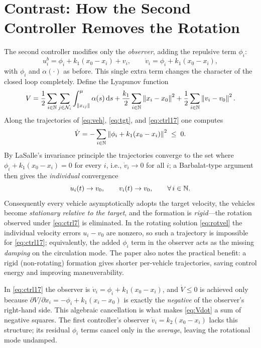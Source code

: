 \section{Contrast: How the Second Controller Removes the Rotation}
\label{sec:second}

The second controller modifies only the \emph{observer}, adding the repulsive term $\phi_i$:
\begin{equation}
  \boxed{\; u_i^b=\phi_i+k_1(x_0-x_i)+v_i, \qquad
  \dot{v}_i=\phi_i+k_1(x_0-x_i), \;}
  \label{eq:ctrl17}
\end{equation}
with $\phi_i$ and $\alpha(\cdot)$ as before. This single extra term changes the character of the
closed loop completely. Define the Lyapunov function
\begin{equation}
  V=\frac12\sum_{i\in\mathbb{N}}\sum_{j\in\mathcal{N}_i}\int_{\left\| x_{ij} \right\|}^{\mu}\alpha(s)\,\mathrm{d} s
    +\frac{k_1}{2}\sum_{i\in\mathbb{N}}\left\| x_i-x_0 \right\|^2
    +\frac12\sum_{i\in\mathbb{N}}\left\| v_i-v_0 \right\|^2 .
  \label{eq:lyap}
\end{equation}
Along the trajectories of \eqref{eq:veh}, \eqref{eq:tgt}, and \eqref{eq:ctrl17} one computes
\begin{equation}
  \dot{V}=-\sum_{i\in\mathbb{N}}\left\| \phi_i+k_1(x_0-x_i) \right\|^2\;\le\;0 .
  \label{eq:Vdot}
\end{equation}
By LaSalle's invariance principle the trajectories converge to the set where
$\phi_i+k_1(x_0-x_i)=0$ for every $i$, i.e., $\dot{v}_i\to0$ for all $i$; a Barbalat-type argument
then gives the \emph{individual} convergence
\begin{equation}
  u_i(t)\to v_0,\qquad v_i(t)\to v_0,\qquad \forall\,i\in\mathbb{N} .
  \label{eq:indiv}
\end{equation}
Consequently every vehicle asymptotically adopts the target velocity, the vehicles become
\emph{stationary relative to the target}, and the formation is \emph{rigid}---the rotation observed
under \eqref{eq:ctrl7} is eliminated. In the rotating solution \eqref{eq:rotvel} the individual
velocity errors $u_i-v_0$ are nonzero, so such a trajectory is impossible for \eqref{eq:ctrl17};
equivalently, the added $\phi_i$ term in the observer acts as the missing \emph{damping} on the
circulation mode. The paper also notes the practical benefit: a rigid (non-rotating) formation gives
shorter per-vehicle trajectories, saving control energy and improving maneuverability.

\begin{remark}
In \eqref{eq:ctrl17} the observer is $\dot{v}_i=\phi_i+k_1(x_0-x_i)$, and $\dot{V}\le0$ is achieved
only because $\partial V/\partial x_i = -\phi_i+k_1(x_i-x_0)$ is exactly the \emph{negative} of the
observer's right-hand side. This algebraic cancellation is what makes \eqref{eq:Vdot} a sum of
negative squares. The first controller's observer $\dot{v}_i=k_2(x_0-x_i)$ lacks this structure; its
residual $\phi_i$ terms cancel only in the \emph{average}, leaving the rotational mode undamped.
\end{remark}

